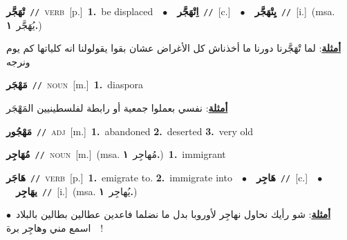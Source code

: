 \documentclass[10pt,a4paper,twoside]{article} %
\begin{document}
\begin{multicols}{2}
{\setlength\topsep{0pt}\textbf{\foreignlanguage{arabic}{تْهَجَّر}}\ {\color{gray}\texttt{//}\color{black}}\ \textsc{verb}\ [p.]\ \textbf{1.}~be displaced\ \ $\bullet$\ \ \setlength\topsep{0pt}\textbf{\foreignlanguage{arabic}{اِتْهَجَّر}}\ {\color{gray}\texttt{//}\color{black}}\ [c.]\ \ $\bullet$\ \ \setlength\topsep{0pt}\textbf{\foreignlanguage{arabic}{يِتْهَجَّر}}\ {\color{gray}\texttt{//}\color{black}}\ [i.]\ \color{gray}(msa. \foreignlanguage{arabic}{يُهَجَّر}~\foreignlanguage{arabic}{\textbf{١.}})\color{black}\  \begin{flushright}\color{gray}\foreignlanguage{arabic}{\textbf{\underline{\foreignlanguage{arabic}{أمثلة}}}: لما تْهَجَّرنا دورنا ما أخذناش كل الأغراض عشان بقوا يقولولنا انه كلياتها كم يوم ونرجه}\end{flushright}\color{black}} \vspace{2mm}

{\setlength\topsep{0pt}\textbf{\foreignlanguage{arabic}{مَهْجَر}}\ {\color{gray}\texttt{//}\color{black}}\ \textsc{noun}\ [m.]\ \textbf{1.}~diaspora\  \begin{flushright}\color{gray}\foreignlanguage{arabic}{\textbf{\underline{\foreignlanguage{arabic}{أمثلة}}}: نفسي بعملوا جمعية أو رابطة لفلسطينيين المَهْجَر}\end{flushright}\color{black}} \vspace{2mm}

{\setlength\topsep{0pt}\textbf{\foreignlanguage{arabic}{مَهْجُور}}\ {\color{gray}\texttt{//}\color{black}}\ \textsc{adj}\ [m.]\ \textbf{1.}~abandoned  \textbf{2.}~deserted  \textbf{3.}~very old\ } \vspace{2mm}

{\setlength\topsep{0pt}\textbf{\foreignlanguage{arabic}{مُهَاجِر}}\ {\color{gray}\texttt{//}\color{black}}\ \textsc{noun}\ [m.]\ \color{gray}(msa. \foreignlanguage{arabic}{مُهاجِر}~\foreignlanguage{arabic}{\textbf{١.}})\color{black}\ \textbf{1.}~immigrant\ } \vspace{2mm}

{\setlength\topsep{0pt}\textbf{\foreignlanguage{arabic}{هَاجَر}}\ {\color{gray}\texttt{//}\color{black}}\ \textsc{verb}\ [p.]\ \textbf{1.}~emigrate to.  \textbf{2.}~immigrate into\ \ $\bullet$\ \ \setlength\topsep{0pt}\textbf{\foreignlanguage{arabic}{هَاجِر}}\ {\color{gray}\texttt{//}\color{black}}\ [c.]\ \ $\bullet$\ \ \setlength\topsep{0pt}\textbf{\foreignlanguage{arabic}{يهَاجِر}}\ {\color{gray}\texttt{//}\color{black}}\ [i.]\ \color{gray}(msa. \foreignlanguage{arabic}{يُهاجِر}~\foreignlanguage{arabic}{\textbf{١.}})\color{black}\  \begin{flushright}\color{gray}\foreignlanguage{arabic}{\textbf{\underline{\foreignlanguage{arabic}{أمثلة}}}: شو رأيك نحاول نهاجِر لأوروبا بدل ما نضلما فاعدين عطالين بطالين بالبلاد\ $\bullet$\ \  اسمع مني وهاجِر برة!}\end{flushright}\color{black}} \vspace{2mm}


\end{multicols}
\end{document}
